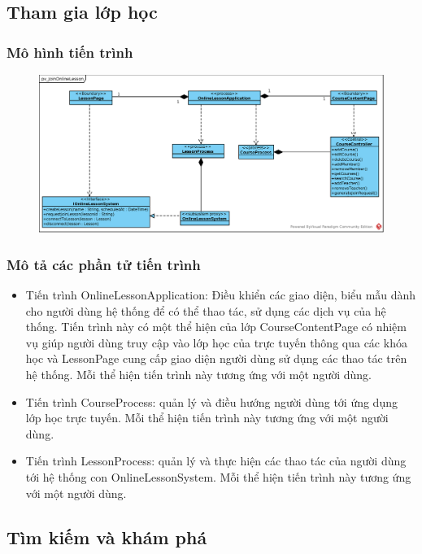 \documentclass[./../main_file.tex]{subfiles}
\begin{document}
\subsection{Tham gia lớp học}

\subsubsection{Mô hình tiến trình}

\begin{figure}[H]
	\centering
	\includegraphics[width=\linewidth]{./images/pv_JoinOnlineLesson.eps}
\end{figure}

\subsubsection{Mô tả các phần tử tiến trình}
\begin{itemize}
	\item Tiến trình OnlineLessonApplication: Điều khiển các giao diện, biểu mẫu dành cho người dùng hệ thống để có thể thao tác, sử dụng các dịch vụ của hệ thống. Tiến trình này có một thể hiện của lớp CourseContentPage có nhiệm vụ giúp người dùng truy cập vào lớp học của trực tuyến thông qua các khóa học và LessonPage cung cấp giao diện người dùng sử dụng các thao tác trên hệ thống.
	Mỗi thể hiện tiến trình này tương ứng với một người dùng.
	\item Tiến trình CourseProcess: quản lý và điều hướng người dùng tới ứng dụng lớp học trực tuyến.
	Mỗi thể hiện tiến trình này tương ứng với một người dùng.
	\item Tiến trình LessonProcess: quản lý và thực hiện các thao tác của người dùng tới  hệ thống con OnlineLessonSystem.
	Mỗi thể hiện tiến trình này tương ứng với một người dùng.
	
\end{itemize}

\subsection{Tìm kiếm và khám phá}
\end{document}
